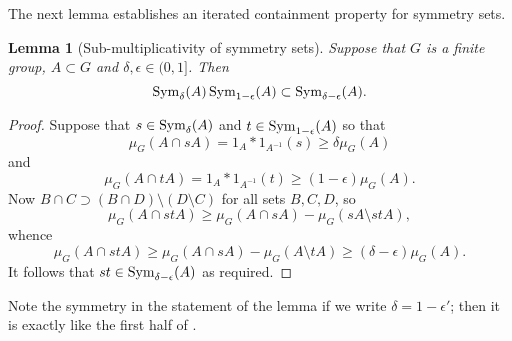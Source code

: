 \documentclass[12pt]{amsart}
\numberwithin{equation}{section}
\theoremstyle{plain}
\newtheorem{lemma}[subsection]{Lemma}
\theoremstyle{definition}
\renewcommand{\geq}{\geqslant}
\providecommand{\Sym}{\mathop{\rm Sym}\nolimits}
\begin{document}
The next lemma establishes an iterated containment property for symmetry sets. 
\begin{lemma}[Sub-multiplicativity of symmetry sets]\label{lem.sub-mult}
Suppose that $G$ is a finite group, $A \subset G$ and $\delta,\epsilon\in (0,1]$. Then
\begin{equation*}
\Sym_{\delta}(A)\Sym_{1-\epsilon}(A) \subset \Sym_{\delta-\epsilon}(A).
\end{equation*}
\end{lemma}
\begin{proof}
Suppose that $s \in \Sym_\delta(A)$ and $t \in \Sym_{1-\epsilon}(A)$ so that
\begin{equation*}
\mu_G(A \cap sA)=1_A \ast 1_{A^{-1}}(s) \geq \delta \mu_G(A)
\end{equation*}
and
\begin{equation*}
\mu_G(A\cap tA) =1_A \ast 1_{A^{-1}}(t) \geq (1-\epsilon)\mu_G(A).
\end{equation*}
Now $B \cap C \supset (B \cap D) \setminus (D \setminus C)$ for all sets $B,C,D$, so 
\begin{equation*}
\mu_G(A\cap stA) \geq \mu_G(A \cap sA)- \mu_G(sA \setminus stA),
\end{equation*}
whence
\begin{equation*}
\mu_G(A\cap stA) \geq \mu_G(A\cap sA) - \mu_G(A \setminus tA) \geq (\delta-\epsilon)\mu_G(A).
\end{equation*}
It follows that $st \in \Sym_{\delta - \epsilon}(A)$ as required.
\end{proof}
Note the symmetry in the statement of the lemma if we write $\delta=1-\epsilon'$; then it is exactly like the first half of \cite[Lemma 2.33]{TCTVHV}.
\end{document}
